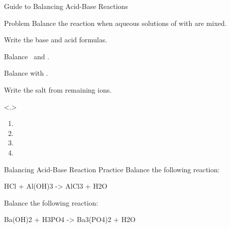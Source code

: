\documentclass[11pt,letterpaper]{article}
\begin{document}

\begin{frame}{Guide to Balancing Acid-Base Reactions}
	\begin{block}{Problem}
		Balance the reaction when aqueous solutions of  with
		 are mixed.
	\end{block}

	\bigskip

	\begin{description}[<+(1)->]
		\item[Step 1] Write the base and acid formulas.
		\item[Step 2] Balance \Hyd\ and .
		\item[Step 3] Balance with \water.
		\item[Step 4] Write the salt from remaining ions.
	\end{description}

	{
		\begin{enumerate}
			\item {}
			\item {}
			\item {}
			\item {}
		\end{enumerate}
		}
\end{frame}

\clearpage

\begin{frame}[t]{Balancing Acid-Base Reaction Practice}
	Balance the following reaction:

	\begin{reaction*}
		HCl\aq{} + Al(OH)3\aq{} -> AlCl3\aq{} + H2O\lqd
	\end{reaction*}
\end{frame}

\begin{onyourown}
	Balance the following reaction:

	\begin{reaction*}
		Ba(OH)2\aq{} + H3PO4\aq{} -> Ba3(PO4)2\sld{} + H2O\lqd{}
	\end{reaction*}
\end{onyourown}
\end{document}
